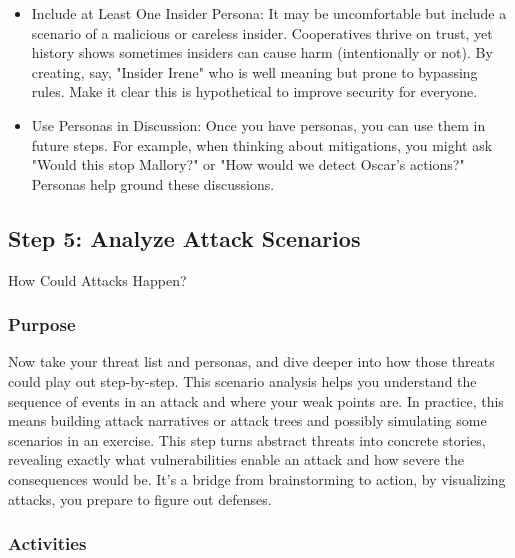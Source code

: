 \begin{itemize}
    \item Include at Least One Insider Persona: It may be uncomfortable but include a scenario of a malicious or
    careless insider. Cooperatives thrive on trust, yet history shows sometimes insiders can cause harm (intentionally
    or not). By creating, say, "Insider Irene" who is well meaning but prone to bypassing rules.
    Make it clear this is hypothetical to improve security for everyone.
    
    \item Use Personas in Discussion: Once you have personas, you can use them in future steps. For example, when
    thinking about mitigations, you might ask "Would this stop Mallory?" or "How would we detect Oscar's actions?"
    Personas help ground these discussions.
\end{itemize}

\subsection{Step 5: Analyze Attack Scenarios}
\label{subsec:Step5}

How Could Attacks Happen?

\subsubsection{Purpose}

Now take your threat list and personas, and dive deeper into how those threats
could play out step-by-step. This scenario analysis helps you understand the
sequence of events in an attack and where your weak points are. In practice,
this means building attack narratives or attack trees and possibly simulating
some scenarios in an exercise. This step turns abstract threats into
concrete stories, revealing exactly what vulnerabilities enable an attack and
how severe the consequences would be. It's a bridge from brainstorming to
action, by visualizing attacks, you prepare to figure out defenses.

\subsubsection{Activities}

